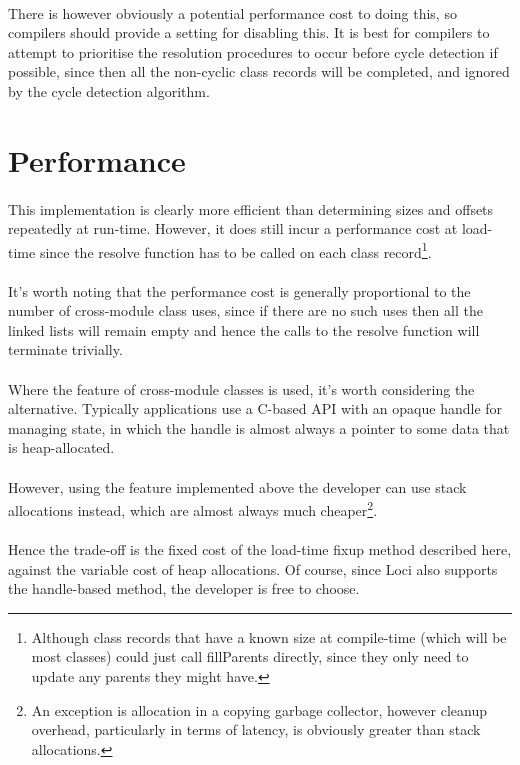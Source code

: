 \documentclass{article}
\begin{document}
\paragraph{}
There is however obviously a potential performance cost to doing this, so compilers should provide a setting for disabling this. It is best for compilers to attempt to prioritise the resolution procedures to occur before cycle detection if possible, since then all the non-cyclic class records will be completed, and ignored by the cycle detection algorithm.

\section{Performance}

\paragraph{}
This implementation is clearly more efficient than determining sizes and offsets repeatedly at run-time. However, it does still incur a performance cost at load-time since the resolve function has to be called on each class record\footnote{Although class records that have a known size at compile-time (which will be most classes) could just call fillParents directly, since they only need to update any parents they might have.}.

\paragraph{}
It's worth noting that the performance cost is generally proportional to the number of cross-module class uses, since if there are no such uses then all the linked lists will remain empty and hence the calls to the resolve function will terminate trivially.

\paragraph{}
Where the feature of cross-module classes is used, it's worth considering the alternative. Typically applications use a C-based API with an opaque handle for managing state, in which the handle is almost always a pointer to some data that is heap-allocated.

\paragraph{}
However, using the feature implemented above the developer can use stack allocations instead, which are almost always much cheaper\footnote{An exception is allocation in a copying garbage collector, however cleanup overhead, particularly in terms of latency, is obviously greater than stack allocations.}.

\paragraph{}
Hence the trade-off is the fixed cost of the load-time fixup method described here, against the variable cost of heap allocations. Of course, since Loci also supports the handle-based method, the developer is free to choose.
\end{document}
